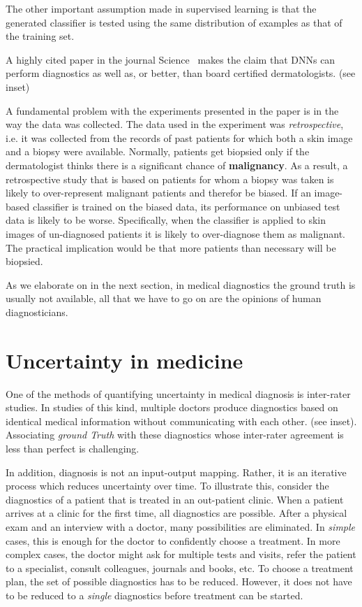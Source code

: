 \documentclass[11pt]{pnas-new}
\begin{document}
The other important assumption made in supervised learning is that the
generated classifier is tested using the same distribution of examples
as that of the training set.



A highly cited paper in the journal Science~\cite{esteva2017dermatologist}
makes the claim that DNNs can perform diagnostics as well as, or better, than board
certified dermatologists. (see inset)

A fundamental problem with the experiments presented in the paper is in the way the data was
collected. The data used in the experiment was {\em retrospective},
i.e. it was collected from the records of past patients for which both
a skin image and a biopsy were available. Normally, patients get
biopsied only if the dermatologist thinks there is a significant
chance of {\bf malignancy}. As a result, a retrospective study that is
based on patients for whom a biopsy was taken is likely to
over-represent malignant patients and therefor be biased. If an image-based classifier
is trained on the biased data, its performance on unbiased test data
is likely to be worse. Specifically, when the classifier is applied to skin
images of un-diagnosed patients it is likely to over-diagnose them as
malignant. The practical implication would be that more patients than
necessary will be biopsied. 

As we elaborate on in the next section, in medical diagnostics the
ground truth is usually not available, all that we have to go on are
the opinions of human diagnosticians.

\section{Uncertainty in medicine}


One of the methods of quantifying uncertainty in medical diagnosis is inter-rater studies.
In studies of this kind, multiple doctors produce diagnostics
based on identical medical information without communicating with each other. (see inset).
Associating {\em ground Truth} with these diagnostics whose inter-rater agreement is less than perfect is challenging.
 
In addition, diagnosis is not an
input-output mapping. Rather, it is an iterative process which reduces
uncertainty over time. To illustrate this, consider the diagnostics of
a patient that is treated in an out-patient clinic.  When a patient
arrives at a clinic for the first time, all diagnostics are
possible. After a physical exam and an interview with a doctor, many
possibilities are eliminated. In {\em simple} cases, this is enough
for the doctor to confidently choose a treatment. In more complex
cases, the doctor might ask for multiple tests and visits, refer the
patient to a specialist, consult colleagues, journals and books,
etc. To choose a treatment plan, the set of possible diagnostics has
to be reduced.  However, it does not have to be reduced to a {\em
  single} diagnostics before treatment can be started.
\end{document}
